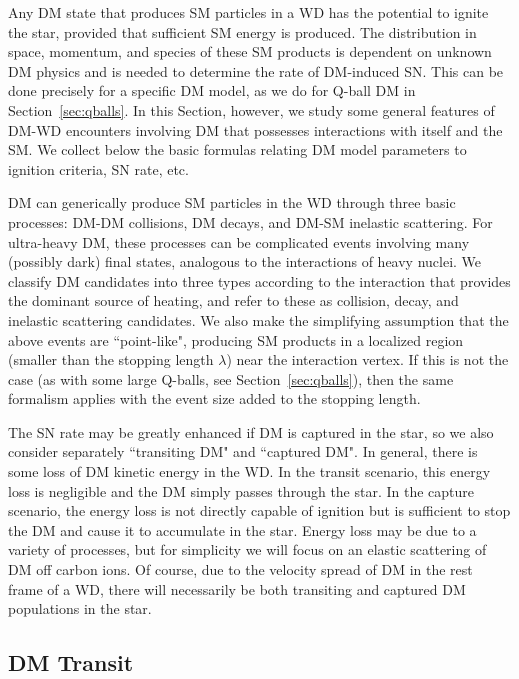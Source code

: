 Any DM state that produces SM particles in a WD has the potential to ignite the star, provided that sufficient SM energy is produced.
The distribution in space, momentum, and species of these SM products is dependent on unknown DM physics and is needed to determine the rate of DM-induced SN.
This can be done precisely for a specific DM model, as we do for Q-ball DM in Section~\ref{sec:qballs}.
In this Section, however, we study some general features of DM-WD encounters involving DM that possesses interactions with itself and the SM.
We collect below the basic formulas relating DM model parameters to ignition criteria, SN rate, etc.

DM can generically produce SM particles in the WD through three basic processes: DM-DM collisions, DM decays, and DM-SM inelastic scattering.
For ultra-heavy DM, these processes can be complicated events involving many (possibly dark) final states, analogous to the interactions of heavy nuclei.
We classify DM candidates into three types according to the interaction that provides the dominant source of heating, and refer to these as collision, decay, and inelastic scattering candidates.
We also make the simplifying assumption that the above events are ``point-like", producing SM products in a localized region (smaller than the stopping length $\lambda$) near the interaction vertex.
If this is not the case (as with some large Q-balls, see Section~\ref{sec:qballs}), then the same formalism applies with the event size added to the stopping length.

The SN rate may be greatly enhanced if DM is captured in the star, so we also consider separately ``transiting DM" and ``captured DM".
In general, there is some loss of DM kinetic energy in the WD.
In the transit scenario, this energy loss is negligible and the DM simply passes through the star.
In the capture scenario, the energy loss is not directly capable of ignition but is sufficient to stop the DM and cause it to accumulate in the star.
Energy loss may be due to a variety of processes, but for simplicity we will focus on an elastic scattering of DM off carbon ions.
Of course, due to the velocity spread of DM in the rest frame of a WD, there will necessarily be both transiting and captured DM populations in the star.

\subsection{DM Transit}

